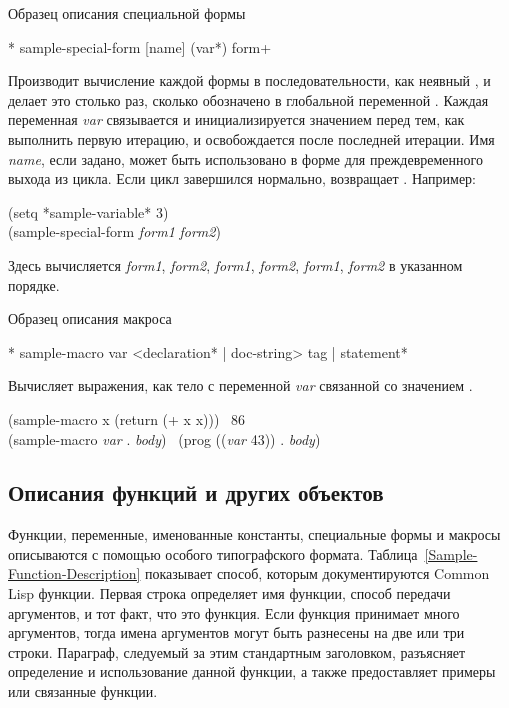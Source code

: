 \begin{table}[t]
\caption{Образец описания специальной формы}
\label{Sample-Special-Form-Description}
\begin{defspec}*
sample-special-form [name] ({var}*) {form}+

Производит вычисление каждой формы в последовательности, как неявный ,
и делает это столько раз, сколько обозначено в глобальной
переменной . Каждая переменная \emph{var} связывается и
инициализируется значением  перед тем, как выполнить первую итерацию, и
освобождается после последней итерации.
Имя \emph{name}, если задано, может быть использовано в  форме
для преждевременного выхода из цикла. Если цикл завершился
нормально,  возвращает {\nil}.
Например:
\begin{lisp}
(setq *sample-variable* 3) \\
(sample-special-form {\emptylist} \emph{form1} \emph{form2})
\end{lisp}
Здесь вычисляется \emph{form1}, \emph{form2}, \emph{form1},
\emph{form2}, \emph{form1}, \emph{form2} в указанном порядке.  
\end{defspec}
\caption{Образец описания макроса}
\label{Sample-Macro-Description}
\begin{defmac}*
sample-macro var <declaration* | doc-string> {tag | statement}*

Вычисляет выражения, как тело  с переменной \emph{var} связанной со
значением .
\begin{lisp}
(sample-macro x (return (+ x x))) \EV\ 86 \\
(sample-macro \emph{var} . \emph{body}) \EX\ (prog ((\emph{var} 43)) . \emph{body})
\end{lisp}
\end{defmac}
\end{table}

\subsection{Описания функций и других объектов}
\label{FUNCTION-HEADER-NOTATION-SECTION}

Функции, переменные, именованные константы, специальные формы и макросы
описываются с помощью особого типографского формата.
Таблица~\ref{Sample-Function-Description} показывает способ, которым
документируются Common Lisp функции.
Первая строка определяет имя функции, способ передачи аргументов, и тот факт,
что это функция.
Если функция принимает много аргументов, тогда имена аргументов могут быть
разнесены на две или три строки.
Параграф, следуемый за этим стандартным заголовком, разъясняет определение и
использование данной функции, а также предоставляет примеры или связанные
функции.


